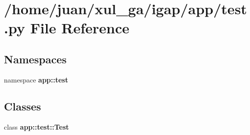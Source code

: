 \section{/home/juan/xul\_\-ga/igap/app/test.py File Reference}
\label{test_8py}
\subsection*{Namespaces}
\begin{CompactItemize}
\item 
namespace {\bf app::test}
\end{CompactItemize}
\subsection*{Classes}
\begin{CompactItemize}
\item 
class {\bf app::test::Test}
\end{CompactItemize}
